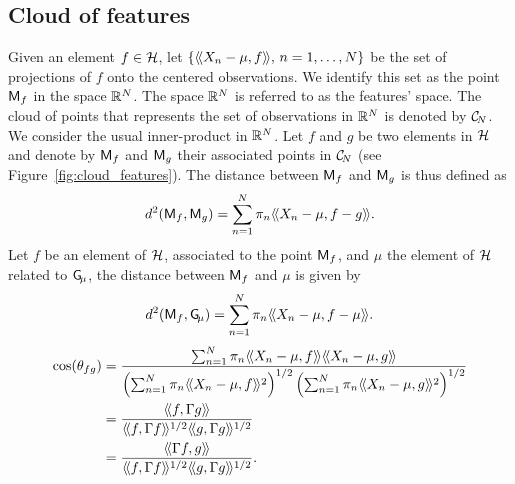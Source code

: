 
\subsection{Cloud of features} %
\label{sub:cloud_of_features}

Given an element $f \in \mathcal{H}$, let $\{\langle\!\langle X_n - \mu, f\rangle\!\rangle,\,n = 1, \dots, N\}$ be the set of projections of $f$ onto the centered observations. We identify this set as the point $\mathsf{M}_f$ in the space $\mathbb{R}^N$. The space $\mathbb{R}^N$ is referred to as the features' space. The cloud of points that represents the set of observations in $\mathbb{R}^N$ is denoted by $\mathcal{C}_{\!N}$.  We consider the usual inner-product in $\mathbb{R}^N$. Let $f$ and $g$ be two elements in $\mathcal{H}$ and denote by $\mathsf{M}_f$ and $\mathsf{M}_g$ their associated points in $\mathcal{C}_{\!N}$ (see Figure~\ref{fig:cloud_features}). The distance between $\mathsf{M}_f$ and $\mathsf{M}_g$ is thus defined as
\begin{equation*}
d^2(\mathsf{M}_f, \mathsf{M}_g) = \sum_{n = 1}^N \pi_n \langle\!\langle X_n - \mu, f - g\rangle\!\rangle.
\end{equation*}
Let $f$ be an element of $\mathcal{H}$, associated to the point $\mathsf{M}_f$, and $\mu$ the element of $\mathcal{H}$ related to $\mathsf{G}_{\!\mu}$, the distance between $\mathsf{M}_f$ and $\mu$ is given by
\begin{equation*}
d^2(\mathsf{M}_f, \mathsf{G}_{\!\mu}) = \sum_{n = 1}^N \pi_n \langle\!\langle X_n - \mu, f - \mu\rangle\!\rangle.
\end{equation*}
\begin{align}
    \cos(\theta_{fg}) &= \frac{\sum_{n = 1}^N \pi_n \inH{X_n - \mu}{f}\inH{X_n - \mu}{g}}{\left(\sum_{n = 1}^N \pi_n \inH{X_n - \mu}{f}^2\right)^{1/2}\left(\sum_{n = 1}^N \pi_n \inH{X_n - \mu}{g}^2\right)^{1/2}} \\
    &= \frac{\inH{f}{\Gamma g}}{\inH{f}{\Gamma f}^{1/2}\inH{g}{\Gamma g}^{1/2}} \\
    &= \frac{\inH{\Gamma f}{g}}{\inH{f}{\Gamma f}^{1/2}\inH{g}{\Gamma g}^{1/2}}.
\end{align}

